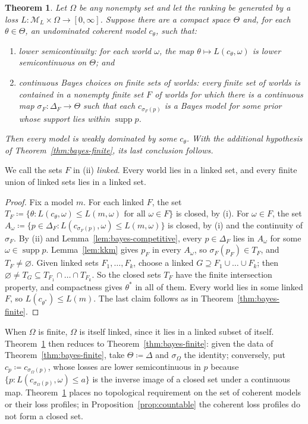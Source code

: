 \documentclass[11pt]{article}
\newtheorem{theorem}{Theorem}[section]
\theoremstyle{definition}
\theoremstyle{remark}
\newcommand{\M}{\mathcal M}
\newcommand{\supp}{\operatorname{supp}}
\begin{document}
\begin{theorem}\label{thm:bayes-infinite}
Let $\Omega$ be any nonempty set and let the ranking be generated by a loss $L:\M_L\times\Omega\to[0,\infty]$. Suppose there are a compact space $\Theta$ and, for each $\theta\in\Theta$, an undominated coherent model $c_\theta$, such that:
\begin{enumerate}[label=(\roman*)]
\item \emph{lower semicontinuity}: for each world $\omega$, the map $\theta\mapsto L(c_\theta,\omega)$ is lower semicontinuous on $\Theta$; and
\item \emph{continuous Bayes choices on finite sets of worlds}: every finite set of worlds is contained in a nonempty finite set $F$ of worlds for which there is a continuous map $\sigma_F:\Delta_F\to\Theta$ such that each $c_{\sigma_F(p)}$ is a Bayes model for some prior whose support lies within $\supp p$.
\end{enumerate}
Then every model is weakly dominated by some $c_\theta$. With the additional hypothesis of Theorem~\ref{thm:bayes-finite}, its last conclusion follows.
\end{theorem}
We call the sets $F$ in (ii) \emph{linked}. Every world lies in a linked set, and every finite union of linked sets lies in a linked set.
\begin{proof}
Fix a model $m$. For each linked $F$, the set $T_F\coloneqq\{\theta:L(c_\theta,\omega)\le L(m,\omega)\text{ for all }\omega\in F\}$ is closed, by (i). For $\omega\in F$, the set $A_\omega\coloneqq\{p\in\Delta_F:L(c_{\sigma_F(p)},\omega)\le L(m,\omega)\}$ is closed, by (i) and the continuity of $\sigma_F$. By (ii) and Lemma~\ref{lem:bayes-competitive}, every $p\in\Delta_F$ lies in $A_\omega$ for some $\omega\in\supp p$. Lemma~\ref{lem:kkm} gives $p_F$ in every $A_\omega$, so $\sigma_F(p_F)\in T_F$, and $T_F\ne\varnothing$. Given linked sets $F_1,\dots,F_k$, choose a linked $G\supseteq F_1\cup\dots\cup F_k$; then $\varnothing\ne T_G\subseteq T_{F_1}\cap\dots\cap T_{F_k}$. So the closed sets $T_F$ have the finite intersection property, and compactness gives $\theta^*$ in all of them. Every world lies in some linked $F$, so $L(c_{\theta^*})\le L(m)$. The last claim follows as in Theorem~\ref{thm:bayes-finite}.
\end{proof}

When $\Omega$ is finite, $\Omega$ is itself linked, since it lies in a linked subset of itself. Theorem~\ref{thm:bayes-infinite} then reduces to Theorem~\ref{thm:bayes-finite}: given the data of Theorem~\ref{thm:bayes-finite}, take $\Theta\coloneqq\Delta$ and $\sigma_\Omega$ the identity; conversely, put $c_p\coloneqq c_{\sigma_\Omega(p)}$, whose losses are lower semicontinuous in $p$ because $\{p:L(c_{\sigma_\Omega(p)},\omega)\le a\}$ is the inverse image of a closed set under a continuous map. Theorem~\ref{thm:bayes-infinite} places no topological requirement on the set of coherent models or their loss profiles; in Proposition~\ref{prop:countable} the coherent loss profiles do not form a closed set.
\end{document}
